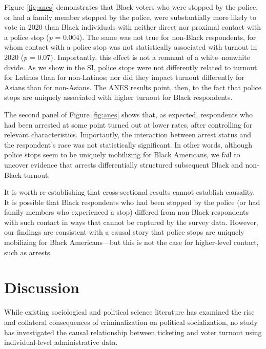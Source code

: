 \documentclass[
  12pt,
]{article}
\begin{document}
Figure \ref{fig:anes} demonstrates that Black voters who were stopped by the police, or had a family member stopped by the police, were substantially more likely to vote in 2020 than Black individuals with neither direct nor proximal contact with a police stop (\emph{p} = 0.004). The same was not true for non-Black respondents, for whom contact with a police stop was not statistically associated with turnout in 2020 (\emph{p} = 0.07). Importantly, this effect is not a remnant of a white--nonwhite divide. As we show in the SI, police stops were not differently related to turnout for Latinos than for non-Latinos; nor did they impact turnout differently for Asians than for non-Asians. The ANES results point, then, to the fact that police stops are uniquely associated with higher turnout for Black respondents.

The second panel of Figure \ref{fig:anes} shows that, as expected, respondents who had been arrested at some point turned out at lower rates, after controlling for relevant characteristics. Importantly, the interaction between arrest status and the respondent's race was not statistically significant. In other words, although police stops seem to be uniquely mobilizing for Black Americans, we fail to uncover evidence that arrests differentially structured subsequent Black and non-Black turnout.

It is worth re-establishing that cross-sectional results cannot establish causality. It is possible that Black respondents who had been stopped by the police (or had family members who experienced a stop) differed from non-Black respondents with such contact in ways that cannot be captured by the survey data. However, our findings are consistent with a causal story that police stops are uniquely mobilizing for Black Americans---but this is not the case for higher-level contact, such as arrests.

\hypertarget{discussion}{%
\section*{Discussion}\label{discussion}}

While existing sociological and political science literature has examined the rise and collateral consequences of criminalization on political socialization, no study has investigated the causal relationship between ticketing and voter turnout using individual-level administrative data.
\end{document}
